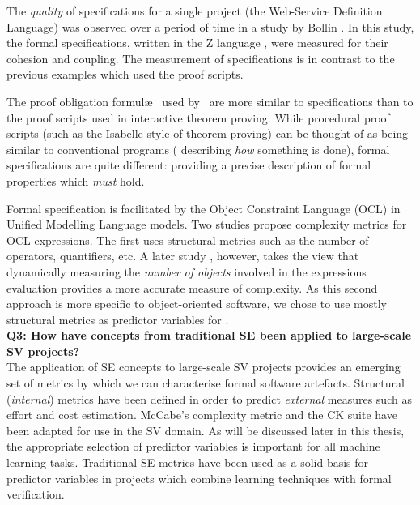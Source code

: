The \textit{quality} of specifications for a single project (the Web-Service Definition Language) was observed over a period of time in a study by Bollin \cite{Zspecs}. In this study, the formal specifications, written in the Z language \cite{Zlang}, were measured for their cohesion and coupling. The measurement of specifications is in contrast to the previous examples \cite{Aspinall2016, CostIndicator} which used the proof scripts. 

The proof obligation formul\ae~ used by \where~are more similar to specifications than to the proof scripts used in interactive theorem proving.
While procedural proof scripts (such as the Isabelle style of theorem proving) can be thought of as being similar to conventional programs ( describing \textit{how} something is done), formal specifications are quite different: providing a precise description of formal properties which \textit{must} hold.
     
Formal specification is facilitated by the Object Constraint Language (OCL) in Unified Modelling Language models. 
Two studies propose complexity metrics for OCL expressions. 
The first \cite{TowardsOCL} uses structural metrics such as the number of operators, quantifiers, etc. 
A later study \cite{OCLalt}, however, takes the view that dynamically measuring the \textit{number of objects} involved in the expressions evaluation provides a more accurate measure of complexity. 
As this second approach is more specific to object-oriented software, we chose to use mostly structural metrics as predictor variables for \where. \\

\textbf{Q3: How have concepts from traditional SE been applied to large-scale SV projects?} \\
The application of SE concepts to large-scale SV projects provides an emerging set of metrics by which we can characterise formal software artefacts.   
Structural (\textit{internal}) metrics have been defined in order to predict \textit{external} measures such as effort and cost estimation. 
McCabe's complexity metric and the CK suite have been adapted for use in the SV domain.
As will be discussed later in this thesis, the appropriate selection of predictor variables is important for all machine learning tasks. 
Traditional SE metrics have been used as a solid basis for predictor variables in projects which combine learning techniques with formal verification.
       
